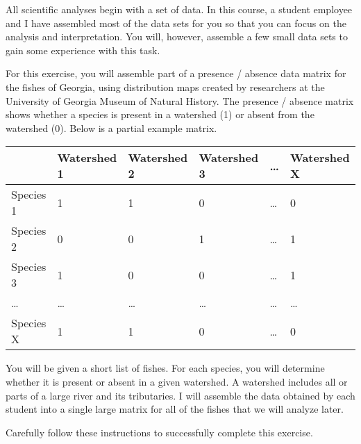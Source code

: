 All scientific analyses begin with a set of data. In this course, a
student employee and I have assembled most of the data sets for you so
that you can focus on the analysis and interpretation. You will,
however, assemble a few small data sets to gain some experience with
this task.

For this exercise, you will assemble part of a presence / absence data
matrix for the fishes of Georgia, using distribution maps created by
researchers at the University of Georgia Museum of Natural History. The
presence / absence matrix shows whether a species is present in a
watershed (1) or absent from the watershed (0). Below is a partial
example matrix.

\begin{longtable}[]{@{}llllll@{}}
\toprule
& Watershed 1 & Watershed 2 & Watershed 3 & \ldots{} & Watershed
X\tabularnewline
\midrule
\endhead
Species 1 & 1 & 1 & 0 & \ldots{} & 0\tabularnewline
Species 2 & 0 & 0 & 1 & \ldots{} & 1\tabularnewline
Species 3 & 1 & 0 & 0 & \ldots{} & 1\tabularnewline
\ldots{} & \ldots{} & \ldots{} & \ldots{} & \ldots{} &
\ldots{}\tabularnewline
Species X & 1 & 1 & 0 & \ldots{} & 0\tabularnewline
\bottomrule
\end{longtable}

You will be given a short list of fishes. For each species, you will
determine whether it is present or absent in a given watershed. A
watershed includes all or parts of a large river and its tributaries. I
will assemble the data obtained by each student into a single large
matrix for all of the fishes that we will analyze later.

Carefully follow these instructions to successfully complete this
exercise.

